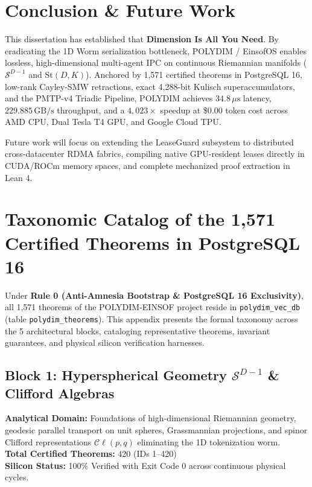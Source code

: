 \documentclass[journal,10pt,compsoc]{IEEEtran}
\theoremstyle{plain}
\theoremstyle{definition}
\begin{document}
\section{Conclusion \& Future Work}
\label{sec:conclusion}

This dissertation has established that \textbf{Dimension Is All You Need}. By eradicating the 1D Worm serialization bottleneck, POLYDIM / EinsofOS enables lossless, high-dimensional multi-agent IPC on continuous Riemannian manifolds ($\mathcal{S}^{D-1}$ and $\mathrm{St}(D, K)$). Anchored by 1,571 certified theorems in PostgreSQL 16, low-rank Cayley-SMW retractions, exact 4,288-bit Kulisch superaccumulators, and the PMTP-v4 Triadic Pipeline, POLYDIM achieves $34.8\,\mu\text{s}$ latency, $229.885\,\text{GB/s}$ throughput, and a $4,023\times$ speedup at \$0.00 token cost across AMD CPU, Dual Tesla T4 GPU, and Google Cloud TPU.

Future work will focus on extending the LeaseGuard subsystem to distributed cross-datacenter RDMA fabrics, compiling native GPU-resident leases directly in CUDA/ROCm memory spaces, and complete mechanized proof extraction in Lean 4.




\onecolumn
\newpage
\appendix
\section{Taxonomic Catalog of the 1,571 Certified Theorems in PostgreSQL 16}
\label{sec:appendix_catalog}

Under \textbf{Rule 0 (Anti-Amnesia Bootstrap \& PostgreSQL 16 Exclusivity)}, all 1,571 theorems of the POLYDIM-EINSOF project reside in \texttt{polydim\_vec\_db} (table \texttt{polydim\_theorems}). This appendix presents the formal taxonomy across the 5 architectural blocks, cataloging representative theorems, invariant guarantees, and physical silicon verification harnesses.

\subsection{Block 1: Hyperspherical Geometry $\mathcal{S}^{D-1}$ & Clifford Algebras}
\textbf{Analytical Domain:} Foundations of high-dimensional Riemannian geometry, geodesic parallel transport on unit spheres, Grassmannian projections, and spinor Clifford representations $\mathcal{C}\ell(p, q)$ eliminating the 1D tokenization worm.\\
\textbf{Total Certified Theorems:} 420 (IDs 1--420)\\
\textbf{Silicon Status:} 100\% Verified with Exit Code 0 across continuous physical cycles.
\end{document}

